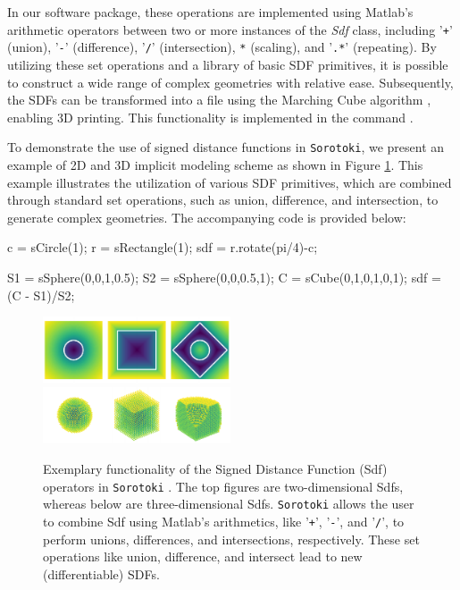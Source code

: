 In our software package, these operations are implemented using Matlab's arithmetic operators between two or more instances of the \textit{Sdf} class, including '\texttt{+}' (union), '\texttt{-}' (difference), '\texttt{/}' (intersection), \texttt{*} (scaling), and '\texttt{.*}' (repeating). By utilizing these set operations and a library of basic SDF primitives, it is possible to construct a wide range of complex geometries with relative ease. Subsequently, the SDFs can be transformed into a  file using the Marching Cube algorithm \cite{Lorensen1987Aug}, enabling 3D printing. This functionality is implemented in the command . \\

\begin{example}
To demonstrate the use of signed distance functions in \texttt{Sorotoki}, we present an example of 2D and 3D implicit modeling scheme as shown in Figure \ref{fig:C5:sdfexample}. This example illustrates the utilization of various SDF primitives, which are combined through standard set operations, such as union, difference, and intersection, to generate complex geometries. The accompanying code is provided below:
\end{example}

\begin{matlabcode}
c   = sCircle(1);
r   = sRectangle(1);
sdf = r.rotate(pi/4)-c;

S1  = sSphere(0,0,1,0.5);
S2  = sSphere(0,0,0.5,1);
C   = sCube(0,1,0,1,0,1);
sdf = (C - S1)/S2;
\end{matlabcode}

\begin{figure}[!t]
\centering
\includegraphics*[width=0.495\textwidth]{./pdf/thesis-figure-6-3-1.pdf}
\includegraphics*[width=0.495\textwidth]{./pdf/thesis-figure-6-3-2.pdf}
%
\caption{Exemplary functionality of the Signed Distance Function (Sdf) operators in \texttt{Sorotoki} . The top figures are two-dimensional Sdfs, whereas below are three-dimensional Sdfs. \texttt{Sorotoki} allows the user to combine Sdf using Matlab's arithmetics, like '\texttt{+}', '\texttt{-}', and '\texttt{/}', to perform unions, differences, and intersections, respectively. These set operations like union, difference, and intersect lead to new (differentiable) SDFs.\label{fig:C5:sdfexample}}
\vspace{-3mm}
\end{figure}

